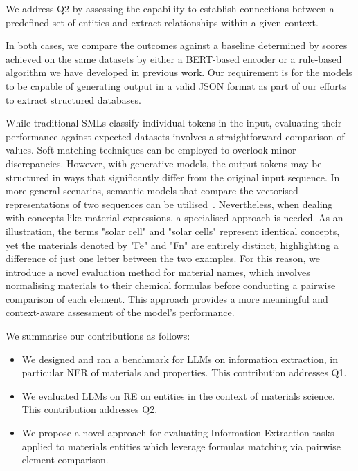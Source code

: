 \documentclass[a4paper]{article}
\begin{document}
We address Q2 by assessing the capability to establish connections between a predefined set of entities and extract relationships within a given context.  

In both cases, we compare the outcomes against a baseline determined by scores achieved on the same datasets by either a BERT-based encoder or a rule-based algorithm we have developed in previous work.
Our requirement is for the models to be capable of generating output in a valid JSON format as part of our efforts to extract structured databases.
 
While traditional SMLs classify individual tokens in the input, evaluating their performance against expected datasets involves a straightforward comparison of values. Soft-matching techniques can be employed to overlook minor discrepancies. 
However, with generative models, the output tokens may be structured in ways that significantly differ from the original input sequence. 
In more general scenarios, semantic models that compare the vectorised representations of two sequences can be utilised~\cite{reimers2019sentencebert}. 
Nevertheless, when dealing with concepts like material expressions, a specialised approach is needed. 
As an illustration, the terms "solar cell" and "solar cells" represent identical concepts, yet the materials denoted by "Fe" and "Fn" are entirely distinct, highlighting a difference of just one letter between the two examples.
For this reason, we introduce a novel evaluation method for material names, which involves normalising materials to their chemical formulas before conducting a pairwise comparison of each element. This approach provides a more meaningful and context-aware assessment of the model's performance.

We summarise our contributions as follows: 

\begin{itemize}
    \item We designed and ran a benchmark for LLMs on information extraction, in particular NER of materials and properties. This contribution addresses Q1. 
    \item We evaluated LLMs on RE on entities in the context of materials science. This contribution addresses Q2.
    \item We propose a novel approach for evaluating Information Extraction tasks applied to materials entities which leverage formulas matching via pairwise element comparison.
\end{itemize}
\end{document}
